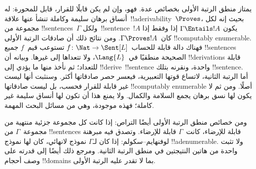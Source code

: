 \documentclass[../../../include/open-logic-section]{subfiles}
\begin{document}


يمتاز منطق الرتبة الأولى بخصائص عدة. فهو، وإن لم يكن قابلًا للقرار،
قابل للمحورة: له أنساق برهان سليمة وكاملة تنشأ عنها
علاقة~!!a{derivability}~$\Proves$، بحيث إنه لكل مجموعة من
!!{sentence}s~$\Gamma$ ولكل~!!{sentence}~$!A$ يكون
$\Gamma \Entails !A$ إذا وفقط إذا كان~$\Gamma \Proves !A$.
ومن نتائج ذلك أن صادقات الرتبة الأولى !!{computably
  enumerable}. فهناك دالة قابلة للحساب~$f\colon \Nat \to
\Sent[L]$ تستوعب قيم~$f$ جميع !!{sentence}s الصحيحة منطقيًا
في~$\Lang{L}$، ولا تتعداها إلى غيرها.
وبيانه أن !!{derivation}s قابلة للتعداد؛ ثم نأخذ منها ما
يؤدي إلى !!{derive}~!!{sentence} واحدة، ونقرنه بتلك
!!{sentence}. أما الرتبة الثانية، لاتساع قوتها التعبيرية،
فيعسر حصر صادقاتها أكثر. وسنثبت أنها ليست غير قابلة للقرار
فحسب، بل ليست صادقاتها !!{computably
  enumerable} أصلًا. ومن ثم لا يكون لها نسق برهان يجمع
السلامة والكمال. ولا يمنع هذا أن تكون لها أنساق سليمة غير كاملة؛
فهذه موجودة، وهي من مسائل البحث المهمة.

ومن خصائص منطق الرتبة الأولى أيضًا التراص: إذا كانت كل مجموعة
جزئية منتهية من مجموعة~$\Gamma$ من !!{sentence}s قابلة للإرضاء،
كانت~$\Gamma$ قابلة للإرضاء. وتصدق فيه مبرهنة لوفنهايم--سكولم:
إذا كان لـ$\Gamma$ نموذج لانهائي، كان لها نموذج !!a{denumerable}.
ولا تثبت واحدة من هاتين النتيجتين في منطق الرتبة الثانية.
ومرجع ذلك أيضًا إلى قدرته على وصف أحجام !!{domain}s
بما لا تقدر عليه الرتبة الأولى.
\end{document}
